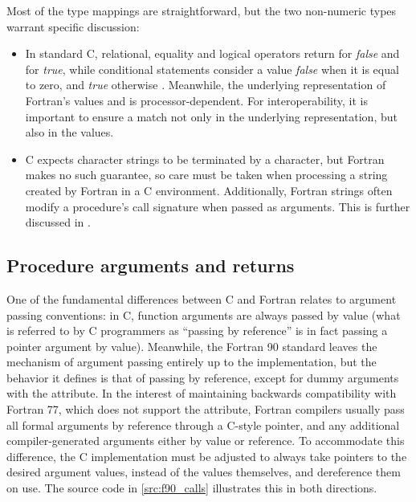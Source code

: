 Most of the type mappings are straightforward, but the two non-numeric types warrant specific discussion: 
\begin{itemize}
	\item In standard C, relational, equality and logical operators return  for \textit{false} and  for \textit{true}, while conditional statements consider a value \textit{false} when it is equal to zero, and \textit{true} otherwise \cite{C11standard}. Meanwhile, the underlying representation of Fortran's  values  and  is processor-dependent. For interoperability, it is important to ensure a match not only in the underlying representation, but also in the values.
	\item C expects character strings to be terminated by a  character, but Fortran makes no such guarantee, so care must be taken when processing a string created by Fortran in a C environment. Additionally, Fortran  strings often modify a procedure's call signature when passed as arguments. This is further discussed in .
\end{itemize}

\subsection{Procedure arguments and returns} \label{sec:interop_f90_calls}

One of the fundamental differences between C and Fortran relates to argument passing conventions: in C, function arguments are always passed by value (what is referred to by C programmers as ``passing by reference'' is in fact passing a pointer argument by value). Meanwhile, the Fortran 90 standard leaves the mechanism of argument passing entirely up to the implementation, but the behavior it defines is that of passing by reference, except for dummy arguments with the  attribute. In the interest of maintaining backwards compatibility with Fortran 77, which does not support the  attribute, Fortran compilers usually pass all formal arguments by reference through a C-style pointer, and any additional compiler-generated arguments either by value or reference. To accommodate this difference, the C implementation must be adjusted to always take pointers to the desired argument values, instead of the values themselves, and dereference them on use. The source code in \ref{src:f90_calls} illustrates this in both directions.

